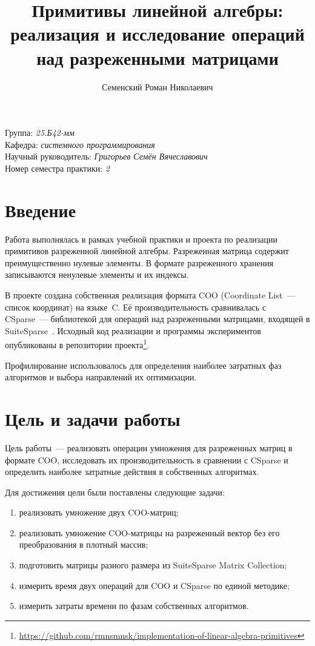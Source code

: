 \documentclass[a4paper]{article}
\title{Примитивы линейной алгебры: реализация и исследование операций над разреженными матрицами}
\author{Семенский Роман Николаевич}
\date{}
\begin{document}
\maketitle
\begin{flushright}
Группа: \emph{25.Б42-мм} \\
Кафедра: \emph{системного программирования} \\
Научный руководитель: \emph{Григорьев Семён Вячеславович} \\
Номер семестра практики: \emph{2}
\end{flushright}

\section{Введение}
Работа выполнялась в рамках учебной практики и проекта по реализации примитивов разреженной линейной алгебры. Разреженная матрица содержит преимущественно нулевые элементы. В формате разреженного хранения записываются ненулевые элементы и их индексы.

В проекте создана собственная реализация формата COO (Coordinate List~--- список координат) на языке~C. Её производительность сравнивалась с CSparse~--- библиотекой для операций над разреженными матрицами, входящей в SuiteSparse~\cite{davis2006}. Исходный код реализации и программы экспериментов опубликованы в репозитории проекта\footnote{\url{https://github.com/rmnsmnsk/implementation-of-linear-algebra-primitives}}.

Профилирование использовалось для определения наиболее затратных фаз алгоритмов и выбора направлений их оптимизации.

\section{Цель и задачи работы}
Цель работы~--- реализовать операции умножения для разреженных матриц в формате COO, исследовать их производительность в сравнении с CSparse и определить наиболее затратные действия в собственных алгоритмах.

Для достижения цели были поставлены следующие задачи:
\begin{enumerate}
\item реализовать умножение двух COO-матриц;
\item реализовать умножение COO-матрицы на разреженный вектор без его преобразования в плотный массив;
\item подготовить матрицы разного размера из SuiteSparse Matrix Collection;
\item измерить время двух операций для COO и CSparse по единой методике;
\item измерить затраты времени по фазам собственных алгоритмов.
\end{enumerate}
\end{document}

